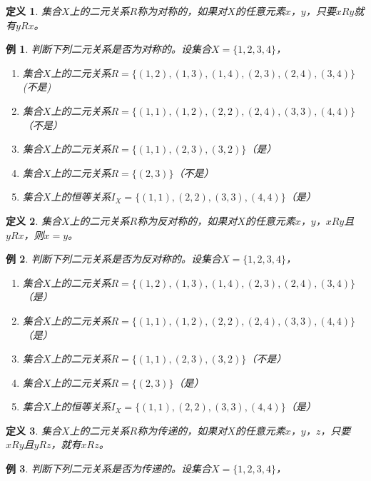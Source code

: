 \documentclass{article}
\newtheorem{Def}{定义}
\newtheorem{Example}{例}
\begin{document}
\begin{CJK*}{UTF8}{gbsn}
  \begin{Def}
    集合$X$上的二元关系$R$称为对称的，如果对$X$的任意元素$x$，$y$，只要$xRy$就有$yRx$。
  \end{Def}
  \begin{Example}
    判断下列二元关系是否为对称的。设集合$X=\{1,2,3,4\}$，
  \begin{enumerate}
  \item 集合$X$上的二元关系$R=\{(1,2), (1,3), (1,4), (2,3),
    (2,4), (3,4)\}$(不是)
  \item 集合$X$上的二元关系$R=\{(1,1), (1,2), (2,2),
    (2,4), (3,3), (4,4)\}$（不是）
  \item 集合$X$上的二元关系$R = \{(1,1), (2,3), (3,2)\}$（是）
  \item 集合$X$上的二元关系$R = \{(2,3)\}$（不是）
  \item 集合$X$上的恒等关系$I_X = \{(1,1), (2,2), (3,3),(4,4)\}$（是）
  \end{enumerate}
\end{Example}
\begin{Def}
         集合$X$上的二元关系$R$称为反对称的，如果对$X$的任意元素$x$，$y$，$xRy$且$yRx$，则$x=y$。    
       \end{Def}
\begin{Example}
    判断下列二元关系是否为反对称的。设集合$X=\{1,2,3,4\}$，
  \begin{enumerate}
  \item 集合$X$上的二元关系$R=\{(1,2), (1,3), (1,4), (2,3),
    (2,4), (3,4)\}$（是）
  \item 集合$X$上的二元关系$R=\{(1,1), (1,2), (2,2),
    (2,4), (3,3), (4,4)\}$（是）
  \item 集合$X$上的二元关系$R = \{(1,1), (2,3), (3,2)\}$（不是）
  \item 集合$X$上的二元关系$R = \{(2,3)\}$（是）
  \item 集合$X$上的恒等关系$I_X = \{(1,1), (2,2), (3,3),(4,4)\}$（是）
  \end{enumerate}
\end{Example}
\begin{Def}
        集合$X$上的二元关系$R$称为传递的，如果对$X$的任意元素$x$，$y$，$z$，只要$xRy$且$yRz$，就有$xRz$。
      \end{Def}
      \begin{Example}
    判断下列二元关系是否为传递的。设集合$X=\{1,2,3,4\}$，

\end{Example}
\end{CJK*}
\end{document}
